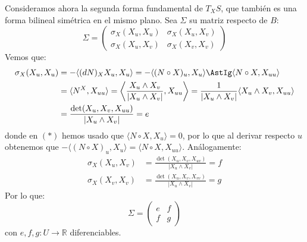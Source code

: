 \noindent
Consideramos ahora la segunda forma fundamental de $T_XS$, que también es una forma bilineal simétrica en el mismo plano. Sea $\Sigma$ su matriz respecto de $B$:
\begin{equation*}
    \Sigma = \left(\begin{array}{cc}
        \sigma_X(X_u,X_u) &\sigma_X(X_u,X_v)  \\
         \sigma_X(X_u,X_v) &  \sigma_X(X_v,X_v)
    \end{array}\right)
\end{equation*}
Vemos que:
\begin{align*}
    \sigma_X(X_u,X_u) &= -\langle (dN)_XX_u,X_u \rangle = - \langle (N\circ X)_u,X_u \rangle \AstIg \langle N\circ X, X_{uu} \rangle  \\
                      &= \langle N^X, X_{uu} \rangle  = \left\langle \frac{X_u\land X_v}{|X_u\land X_v|},X_{uu} \right\rangle = \frac{1}{|X_u\land X_v|}\langle X_u\land X_v,X_{uu} \rangle  \\
                      &= \frac{\det(X_u,X_v,X_{uu})}{|X_u\land X_v|} = e
\end{align*}
donde en $(\ast)$ hemos usado que $\langle N\circ X,X_u \rangle =0$, por lo que al derivar respecto $u$ obtenemos que $-\langle (N\circ X)_u,X_u \rangle = \langle N\circ X,X_{uu} \rangle $. Análogamente:
\begin{align*}
    \sigma_X(X_u,X_v) &= \frac{\det(X_u,X_v,X_{uv})}{|X_u\land X_v|} = f \\
    \sigma_X(X_v,X_v) &= \frac{\det(X_u,X_v,X_{vv})}{|X_u\land X_v|} = g
\end{align*}
Por lo que:
\begin{equation*}
    \Sigma = \left(\begin{array}{cc}
        e & f \\
        f & g 
    \end{array}\right)
\end{equation*}
con $e,f,g:U\to \mathbb{R}$ diferenciables.\\

